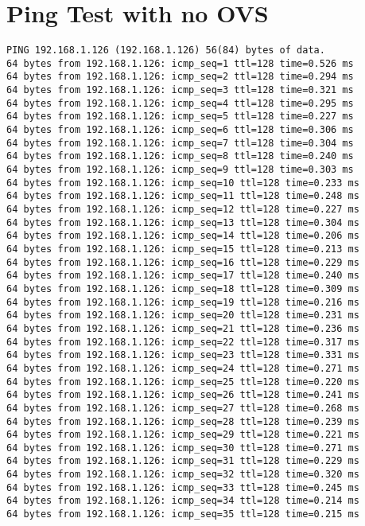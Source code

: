 \section{Ping Test with no OVS}\label{app:sec:Ping_test_no_ovs}
\begin{lstlisting}[frame=single, caption={The Ping test without OVS}, label={lst:Pingtest_no_OVS}]
PING 192.168.1.126 (192.168.1.126) 56(84) bytes of data.
64 bytes from 192.168.1.126: icmp_seq=1 ttl=128 time=0.526 ms
64 bytes from 192.168.1.126: icmp_seq=2 ttl=128 time=0.294 ms
64 bytes from 192.168.1.126: icmp_seq=3 ttl=128 time=0.321 ms
64 bytes from 192.168.1.126: icmp_seq=4 ttl=128 time=0.295 ms
64 bytes from 192.168.1.126: icmp_seq=5 ttl=128 time=0.227 ms
64 bytes from 192.168.1.126: icmp_seq=6 ttl=128 time=0.306 ms
64 bytes from 192.168.1.126: icmp_seq=7 ttl=128 time=0.304 ms
64 bytes from 192.168.1.126: icmp_seq=8 ttl=128 time=0.240 ms
64 bytes from 192.168.1.126: icmp_seq=9 ttl=128 time=0.303 ms
64 bytes from 192.168.1.126: icmp_seq=10 ttl=128 time=0.233 ms
64 bytes from 192.168.1.126: icmp_seq=11 ttl=128 time=0.248 ms
64 bytes from 192.168.1.126: icmp_seq=12 ttl=128 time=0.227 ms
64 bytes from 192.168.1.126: icmp_seq=13 ttl=128 time=0.304 ms
64 bytes from 192.168.1.126: icmp_seq=14 ttl=128 time=0.206 ms
64 bytes from 192.168.1.126: icmp_seq=15 ttl=128 time=0.213 ms
64 bytes from 192.168.1.126: icmp_seq=16 ttl=128 time=0.229 ms
64 bytes from 192.168.1.126: icmp_seq=17 ttl=128 time=0.240 ms
64 bytes from 192.168.1.126: icmp_seq=18 ttl=128 time=0.309 ms
64 bytes from 192.168.1.126: icmp_seq=19 ttl=128 time=0.216 ms
64 bytes from 192.168.1.126: icmp_seq=20 ttl=128 time=0.231 ms
64 bytes from 192.168.1.126: icmp_seq=21 ttl=128 time=0.236 ms
64 bytes from 192.168.1.126: icmp_seq=22 ttl=128 time=0.317 ms
64 bytes from 192.168.1.126: icmp_seq=23 ttl=128 time=0.331 ms
64 bytes from 192.168.1.126: icmp_seq=24 ttl=128 time=0.271 ms
64 bytes from 192.168.1.126: icmp_seq=25 ttl=128 time=0.220 ms
64 bytes from 192.168.1.126: icmp_seq=26 ttl=128 time=0.241 ms
64 bytes from 192.168.1.126: icmp_seq=27 ttl=128 time=0.268 ms
64 bytes from 192.168.1.126: icmp_seq=28 ttl=128 time=0.239 ms
64 bytes from 192.168.1.126: icmp_seq=29 ttl=128 time=0.221 ms
64 bytes from 192.168.1.126: icmp_seq=30 ttl=128 time=0.271 ms
64 bytes from 192.168.1.126: icmp_seq=31 ttl=128 time=0.229 ms
64 bytes from 192.168.1.126: icmp_seq=32 ttl=128 time=0.320 ms
64 bytes from 192.168.1.126: icmp_seq=33 ttl=128 time=0.245 ms
64 bytes from 192.168.1.126: icmp_seq=34 ttl=128 time=0.214 ms
64 bytes from 192.168.1.126: icmp_seq=35 ttl=128 time=0.215 ms

\end{lstlisting}
